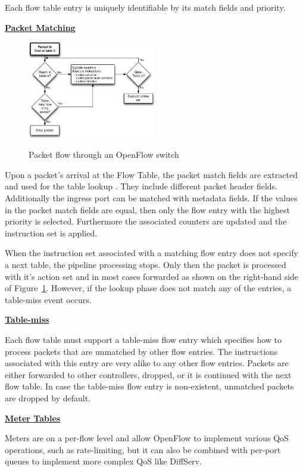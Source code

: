 Each flow table entry is uniquely identifiable by its match fields and priority. 


\underline{\textbf{Packet Matching}}

\begin{figure}[H]
\centering
\includegraphics[width=0.5\textwidth]{images/fundamentals/openflow_packet_matching.png}
\caption{Packet flow through an OpenFlow switch} \cite{ofspecification}\label{fig:of-packetflow}
\end{figure}

Upon a packet's arrival at the Flow Table, the packet match fields are extracted and used for the table lookup \cite{ofspecification}. They include different packet header fields. Additionally the ingress port can be matched with metadata fields.
If the values in the packet match fields are equal, then only the flow entry with the highest priority is selected. Furthermore the associated counters are updated and the instruction set is applied.

When the instruction set associated with a matching flow entry does not specify a next table, the pipeline processing stops. Only then the packet is processed with it's action set and in most cases forwarded as shown on the right-hand side of Figure~\ref{fig:of-packetflow}.
However, if the lookup phase does not match any of the entries, a table-miss event occurs.

\newpage
\underline{\textbf{Table-miss}}

Each flow table must support a table-miss flow entry which specifies how to process packets that are unmatched by other flow entries. The instructions associated with this entry are very alike to any other flow entries. Packets are either forwarded to other controllers, dropped, or it is continued with the next flow table. In case the table-miss flow entry is non-existent, unmatched packets are dropped by default. 

\underline{\textbf{Meter Tables}}

Meters are on a per-flow level and allow OpenFlow to implement various QoS operations, such as rate-limiting, but it can also be combined with per-port queues to implement more complex QoS like DiffServ.

